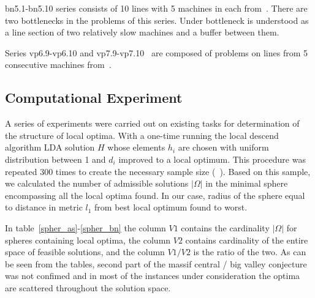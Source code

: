 \documentclass{ifacconf}
\begin{document}
bn5.1-bn5.10 series consists of 10 lines with 5 machines in
each from~\cite{eng1}. There are two bottlenecks in the problems of this series. Under
bottleneck is understood as a line section of two relatively slow machines and a buffer
between them. 

Series vp6.9-vp6.10 and vp7.9-vp7.10~\cite{vp} are composed of problems on lines from
5 consecutive machines from~\cite{vp}. 


\subsection{Computational Experiment} \label{subsec:experiment}

A series of experiments were carried out on existing tasks for
determination of the structure of local optima. With a one-time
running the local descend algorithm LDA solution $H$ whose elements $h_i$ are chosen with
uniform distribution between 1 and $d_i$ improved to a local optimum.
This procedure was repeated 300 times to create the necessary
sample size (~\cite{Boese}). Based on this sample, we calculated the
number of admissible solutions $|\Omega |$ in the minimal sphere encompassing all the
local optima found. In our case, radius of the sphere equal to distance in metric $l_1$ from best local optimum found to worst.

In table~\ref{spher_as}-\ref{spher_bn} the column $V1$ contains the cardinality $| \Omega |$ for spheres containing
local optima, the column $V2$ contains cardinality of the entire space of feasible
solutions, and the column $V1/V2$ is the ratio of the two.
As can be seen from the tables, second part of the massif central / big valley conjecture was not confimed and in most of the instances under consideration
the optima are scattered throughout the solution space.
\end{document}
